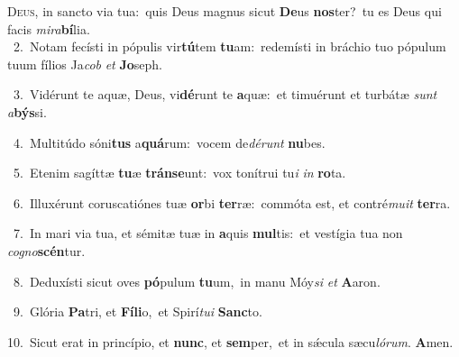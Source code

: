 \lettrine{\initial\textcolor{\initialcolor}{D}}{eus,} in sancto via tua:~\dagger quis Deus magnus sicut \textbf{De}\-us \textbf{nos}\-ter?~\star tu es Deus qui facis \textit{mi}\-\textit{ra}\textbf{bí}lia.\\
{\numbfont\textcolor{\numbcolor}{~2.}}~Notam fecísti in pópulis vir\-\textbf{tú}\-tem \textbf{tu}\-am:~\star redemísti in bráchio tuo pópulum tuum fílios Ja\textit{cob} \textit{et} \textbf{Jo}\-seph.\par
{\numbfont\textcolor{\numbcolor}{~3.}}~Vidérunt te aquæ, Deus, vi\-\textbf{dé}\-runt te \textbf{a}\-quæ:~\star et timuérunt et turbátæ \textit{sunt} \textit{a}\-\textbf{býs}si.\par
{\numbfont\textcolor{\numbcolor}{~4.}}~Multitúdo sóni\textbf{tus} a\-\textbf{quá}\-rum:~\star vocem de\-\textit{dé}\-\textit{runt} \textbf{nu}\-bes.\par
{\numbfont\textcolor{\numbcolor}{~5.}}~Etenim sagíttæ \textbf{tu}\-æ \textbf{tráns}\-\textbf{e}unt:~\star vox tonítrui tu\textit{i} \textit{in} \textbf{ro}\-ta.\par
{\numbfont\textcolor{\numbcolor}{~6.}}~Illuxérunt coruscatiónes tuæ \textbf{or}\-bi \textbf{ter}\-ræ:~\star commóta est, et contré\-\textit{mu}\-\textit{it} \textbf{ter}\-ra.\par
{\numbfont\textcolor{\numbcolor}{~7.}}~In mari via tua, et sémitæ tuæ in \textbf{a}\-quis \textbf{mul}\-tis:~\star et vestígia tua non \textit{co}\-\textit{gno}\textbf{scén}tur.\par
{\numbfont\textcolor{\numbcolor}{~8.}}~Deduxísti sicut oves \textbf{pó}\-pulum \textbf{tu}\-um,~\star in manu Móy\textit{si} \textit{et} \textbf{A}\-aron.\par
{\numbfont\textcolor{\numbcolor}{~9.}}~Glória \textbf{Pa}\-tri, et \textbf{Fí}\-\textbf{li}o,~\star et Spirí\-\textit{tu}\-\textit{i} \textbf{Sanc}\-to.\par
{\numbfont\textcolor{\numbcolor}{10.}}~Sicut erat in princípio, et \textbf{nunc}\-, et \textbf{sem}\-per,~\star et in sǽcula sæcu\-\textit{ló}\-\textit{rum}. \textbf{A}\-men.\par
